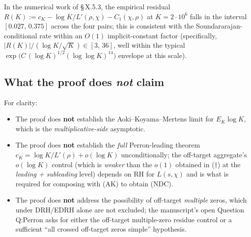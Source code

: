 In the numerical work of \S\,X.5.3, the empirical residual
\(R(K) := c_K - \log K / L'(\rho, \chi) - C_1(\chi, \rho)\) at
\(K = 2\cdot 10^6\) falls in the interval \([0.027,\,0.375]\) across the
four pairs; this is consistent with the Soundararajan-conditional rate
within an \(O(1)\) implicit-constant factor (specifically,
\(|R(K)| / (\log K / \sqrt K) \in [3,\,36]\), well within the typical
\(\exp\bigl(C\,(\log K)^{1/2}(\log\log K)^{14}\bigr)\) envelope at this
scale).

\subsection{What the proof does \emph{not} claim}

For clarity:

\begin{itemize}
\item
  The proof does \textbf{not} establish the Aoki--Koyama--Mertens limit
  for \(E_K \log K\), which is the \emph{multiplicative-side} asymptotic.
\item
  The proof does \textbf{not} establish the \emph{full} Perron-leading theorem
  \(c_K = \log K / L'(\rho) + o(\log K)\) unconditionally; the
  off-target aggregate's \(o(\log K)\) control (which is \emph{weaker} than
  the \(o(1)\) obtained in (\(\dagger\)) at the \emph{leading + subleading}
  level) depends on RH for \(L(s, \chi)\) and is what is required for
  composing with (AK) to obtain (NDC).
\item
  The proof does \textbf{not} address the possibility of off-target
  \emph{multiple} zeros, which under DRH/EDRH alone are not excluded;
  the manuscript's open Question Q:Perron asks for either
  the off-target multiple-zero residue control or a sufficient
  ``all crossed off-target zeros simple'' hypothesis.
\end{itemize}
